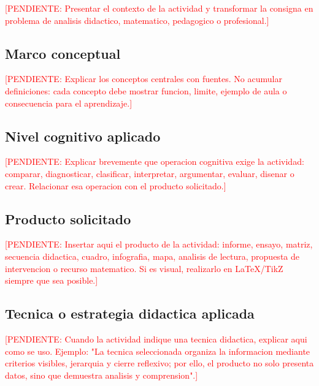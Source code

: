 \documentclass[
	spanish,
	letterpaper, oneside
]{article}
\newcommand{\pendiente}[1]{\textcolor{red}{[PENDIENTE: #1]}}
\begin{document}
\pendiente{Presentar el contexto de la actividad y transformar la consigna en problema de analisis didactico, matematico, pedagogico o profesional.}

\subsection{Marco conceptual}

\pendiente{Explicar los conceptos centrales con fuentes. No acumular definiciones: cada concepto debe mostrar funcion, limite, ejemplo de aula o consecuencia para el aprendizaje.}

\subsection{Nivel cognitivo aplicado}

\pendiente{Explicar brevemente que operacion cognitiva exige la actividad: comparar, diagnosticar, clasificar, interpretar, argumentar, evaluar, disenar o crear. Relacionar esa operacion con el producto solicitado.}

\subsection{Producto solicitado}

\pendiente{Insertar aqui el producto de la actividad: informe, ensayo, matriz, secuencia didactica, cuadro, infografia, mapa, analisis de lectura, propuesta de intervencion o recurso matematico. Si es visual, realizarlo en LaTeX/TikZ siempre que sea posible.}

\subsection{Tecnica o estrategia didactica aplicada}

\pendiente{Cuando la actividad indique una tecnica didactica, explicar aqui como se uso. Ejemplo: "La tecnica seleccionada organiza la informacion mediante criterios visibles, jerarquia y cierre reflexivo; por ello, el producto no solo presenta datos, sino que demuestra analisis y comprension".}
\end{document}

